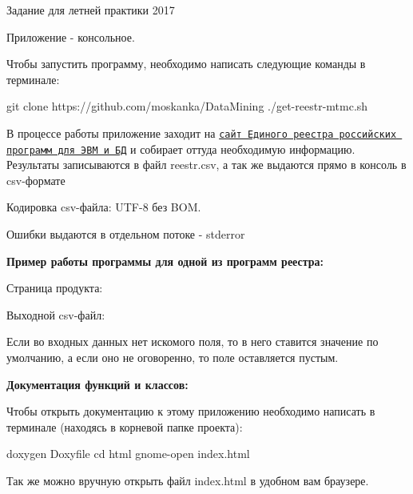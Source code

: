 
\begin{DoxyItemize}
\item Задание для летней практики 2017
\end{DoxyItemize}

Приложение -\/ консольное.

Чтобы запустить программу, необходимо написать следующие команды в терминале\+: 
\begin{DoxyCode}
git clone https://github.com/moskanka/DataMining
./get-reestr-mtmc.sh
\end{DoxyCode}


В процессе работы приложение заходит на \href{https://reestr.minsvyaz.ru/reestr/}{\tt сайт Единого реестра российских программ для ЭВМ и БД} и собирает оттуда необходимую информацию. Результаты записываются в файл {\ttfamily reestr.\+csv}, а так же выдаются прямо в консоль в {\ttfamily csv}-\/формате

Кодировка {\ttfamily csv}-\/файла\+: U\+T\+F-\/8 без B\+OM.

Ошибки выдаются в отдельном потоке -\/ {\ttfamily stderror}

{\bfseries Пример работы программы для одной из программ реестра\+:}


\begin{DoxyItemize}
\item Страница продукта\+: 
\item Выходной {\ttfamily csv}-\/файл\+: 
\item Если во входных данных нет искомого поля, то в него ставится значение по умолчанию, а если оно не оговоренно, то поле оставляется пустым.
\end{DoxyItemize}

{\bfseries Документация функций и классов\+:}

Чтобы открыть документацию к этому приложению необходимо написать в терминале (находясь в корневой папке проекта)\+: 
\begin{DoxyCode}
doxygen Doxyfile
cd html
gnome-open index.html
\end{DoxyCode}
 Так же можно вручную открыть файл {\ttfamily index.\+html} в удобном вам браузере. 
